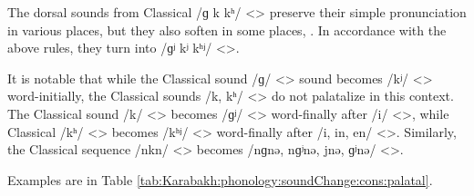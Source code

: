 The dorsal sounds from Classical /ɡ k kʰ/ <> preserve their simple pronunciation in various places, but they also soften in some places, . In accordance with the above rules, they turn into /ɡʲ kʲ kʰʲ/ <>. 

It is notable that while the Classical sound /ɡ/ <> sound becomes /kʲ/ <> word-initially, the Classical sounds /k, kʰ/ <> do not palatalize in this context. The Classical sound /k/ <> becomes /ɡʲ/ <> word-finally after /i/ <>, while Classical /kʰ/ <> becomes /kʰʲ/ <> word-finally after /i, in, en/ <>. Similarly, the Classical sequence /nkn/ <> becomes /nɡnə, nɡʲnə, jnə, ɡʲnə/ <>. 



Examples are in Table \ref{tab:Karabakh:phonology:soundChange:cons:palatal}. 


